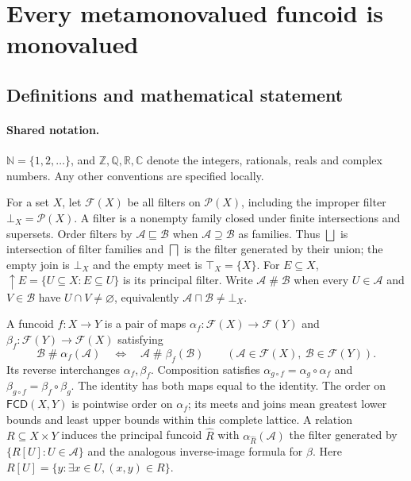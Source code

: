 \documentclass[11pt]{article}
\begin{document}
\section{Every metamonovalued funcoid is monovalued}\label{statement}

\subsection{Definitions and mathematical statement}

\paragraph{Shared notation.}$\mathbb N=\{1,2,\ldots\}$, and $\mathbb Z,\mathbb Q,\mathbb R,\mathbb C$ denote the integers, rationals, reals and complex numbers. Any other conventions are specified locally.


For a set $X$, let $\mathcal F(X)$ be all filters on $\mathcal P(X)$, including the improper filter $\bot_X=\mathcal P(X)$. A filter is a nonempty family closed under finite intersections and supersets. Order filters by $\mathcal A\sqsubseteq\mathcal B$ when $\mathcal A\supseteq\mathcal B$ as families. Thus $\bigsqcup$ is intersection of filter families and $\bigsqcap$ is the filter generated by their union; the empty join is $\bot_X$ and the empty meet is $\top_X=\{X\}$. For $E\subseteq X$, $\uparrow E=\{U\subseteq X:E\subseteq U\}$ is its principal filter. Write $\mathcal A\mathrel{\#}\mathcal B$ when every $U\in\mathcal A$ and $V\in\mathcal B$ have $U\cap V\ne\varnothing$, equivalently $\mathcal A\sqcap\mathcal B\ne\bot_X$.

A funcoid $f:X\to Y$ is a pair of maps $\alpha_f:\mathcal F(X)\to\mathcal F(Y)$ and $\beta_f:\mathcal F(Y)\to\mathcal F(X)$ satisfying
\[
 \mathcal B\mathrel{\#}\alpha_f(\mathcal A)
 \quad\Longleftrightarrow\quad
 \mathcal A\mathrel{\#}\beta_f(\mathcal B)
 \qquad(\mathcal A\in\mathcal F(X),\ \mathcal B\in\mathcal F(Y)).
\]
Its reverse interchanges $\alpha_f,\beta_f$. Composition satisfies $\alpha_{g\circ f}=\alpha_g\circ\alpha_f$ and $\beta_{g\circ f}=\beta_f\circ\beta_g$. The identity has both maps equal to the identity. The order on $\mathsf{FCD}(X,Y)$ is pointwise order on $\alpha_f$; its meets and joins mean greatest lower bounds and least upper bounds within this complete lattice. A relation $R\subseteq X\times Y$ induces the principal funcoid $\widehat R$ with $\alpha_{\widehat R}(\mathcal A)$ the filter generated by $\{R[U]:U\in\mathcal A\}$ and the analogous inverse-image formula for $\beta$. Here $R[U]=\{y:\exists x\in U,(x,y)\in R\}$.
\end{document}
